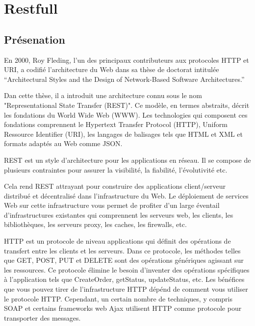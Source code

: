 \section{Restfull}
\label{ch:restfull}

\subsection{Présenation}

En 2000, Roy Fleding, l’un des principaux contributeurs aux protocoles HTTP et URI, a codifié l’architecture du Web dans sa thèse de doctorat intitulée “Architectural Styles and the Design of Network-Based Software Architectures.”

Dan cette thèse, il a introduit une architecture connu sous le nom "Representational State Transfer (REST)". Ce modèle, en termes abstraits, décrit les fondations du World Wide Web (WWW). Les technologies qui composent ces fondations comprennent le Hypertext Transfer Protocol (HTTP), Uniform Ressource Identifier (URI), les langages de balisages tels que HTML et XML et formats adaptés au Web comme JSON.

REST est un style d’architecture pour les applications en réseau. Il se compose de plusieurs contraintes pour assurer la visibilité, la fiabilité, l'évolutivité etc.

Cela rend REST attrayant pour construire des applications client/serveur distribué et décentralisé dans l'infrastructure du Web. Le déploiement de services Web sur cette infrastructure vous permet de profiter d’un large éventail d'infrastructures existantes qui comprennent les serveurs web, les clients, les bibliothèques, les serveurs proxy, les caches, les firewalls, etc.

HTTP est un protocole de niveau applications qui définit des opérations de transfert entre les clients et les serveurs. Dans ce protocole, les méthodes telles que GET, POST, PUT et DELETE sont des opérations génériques agissant sur les ressources. Ce protocole élimine le besoin d'inventer des opérations spécifiques à l’application tels que CreateOrder, getStatus, updateStatus, etc.  Les bénéfices que vous pouvez tirer de l'infrastructure HTTP dépénd de comment vous utiliser le protocole HTTP. Cependant, un certain nombre de techniques, y compris SOAP et certains frameworks web Ajax utilisent HTTP comme protocole pour transporter des messages. 
